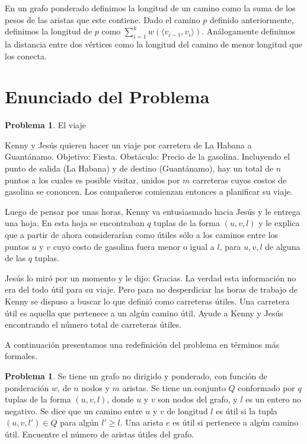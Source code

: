 \documentclass[10pt]{amsart}
\theoremstyle{definition}
\newtheorem{prob}[theorem]{Problema}
\numberwithin{equation}{section}
\newcommand{\edge}[1]{\langle #1\rangle}
\begin{document}
	En un grafo ponderado definimos la longitud de un camino como la suma de los pesos de las aristas que este contiene. Dado el camino $p$ definido anteriormente, definimos la longitud de $p$ como $\sum_{i = 1}^k w(\edge{v_{i - 1}, v_i})$. An\'alogamente definimos la distancia entre dos v\'ertices como la longitud del camino de menor longitud que los conecta.
	
\section{Enunciado del Problema}
	\begin{prob}
		El viaje
	
		Kenny y Jesús quieren hacer un viaje por carretera de La Habana a Guantánamo. Objetivo: Fiesta. Obstáculo: Precio de la gasolina. Incluyendo el punto de salida (La Habana) y de destino (Guantánamo), hay un total de $n$ puntos a los cuales es posible visitar, unidos por $m$ carreteras cuyos costos de gasolina se cononcen. Los compañeros comienzan entonces a planificar su viaje.
		
		Luego de pensar por unas horas, Kenny va entusiasmado hacia Jesús y le entrega una hoja. En esta hoja se encontraban $q$ tuplas de la forma $(u, v, l)$ y le explica que a partir de ahora considerarían como útiles sólo a los caminos entre los puntos $u$ y $v$ cuyo costo de gasolina fuera menor o igual a $l$, para $u, v, l$ de alguna de las $q$ tuplas.
		
		Jesús lo miró por un momento y le dijo: Gracias. La verdad esta información no era del todo útil para su viaje. Pero para no desperdiciar las horas de trabajo de Kenny se dispuso a buscar lo que definió como carreteras útiles. Una carretera útil es aquella que pertenece a un algún camino útil. Ayude a Kenny y Jesús encontrando el número total de carreteras útiles.
	\end{prob}	

A continuaci\'on presentamos una redefinici\'on del problema en t\'erminos m\'as formales.

	\begin{prob}
		Se tiene un grafo no dirigido y ponderado, con funci\'on de ponderaci\'on $w$, de $n$ nodos y $m$ aristas. Se tiene un conjunto $Q$ conformado por $q$ tuplas de la forma $(u,v,l)$, donde $u$ y $v$ son nodos del grafo, y $l$ es un entero no negativo. Se dice que un camino entre $u$ y $v$ de longitud $l$ es \'util si la tupla $(u,v,l') \in Q$ para alg\'un $l' \ge l$. Una arista $e$ es \'util si pertenece a alg\'un camino \'util. Encuentre el n\'umero de aristas \'utiles del grafo.
	\end{prob}
\end{document}
